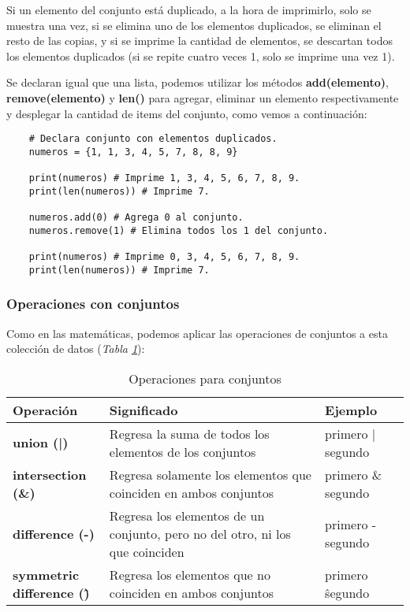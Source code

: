 Si un elemento del conjunto está duplicado, a la hora de imprimirlo, solo se muestra una vez, si se elimina uno de los elementos duplicados, se eliminan el resto de las copias, y si se imprime la cantidad de elementos, se descartan todos los elementos duplicados (si se repite cuatro veces 1, solo se imprime una vez 1).

Se declaran igual que una lista, podemos utilizar los métodos \textbf{add(elemento)},  \textbf{remove(elemento)} y \textbf{len()} para agregar, eliminar un elemento respectivamente y desplegar la cantidad de items del conjunto, como vemos a continuación:
\begin{lstlisting}
    # Declara conjunto con elementos duplicados.
    numeros = {1, 1, 3, 4, 5, 7, 8, 8, 9}

    print(numeros) # Imprime 1, 3, 4, 5, 6, 7, 8, 9.
    print(len(numeros)) # Imprime 7.

    numeros.add(0) # Agrega 0 al conjunto.
    numeros.remove(1) # Elimina todos los 1 del conjunto.

    print(numeros) # Imprime 0, 3, 4, 5, 6, 7, 8, 9.
    print(len(numeros)) # Imprime 7.
\end{lstlisting}


\subsubsection{Operaciones con conjuntos}

Como en las matemáticas, podemos aplicar las operaciones de conjuntos a esta colección de datos (\textit{Tabla \ref{tab: 9}}):
\begin{table}[H]
    \begin{center}
        \caption{Operaciones para conjuntos}
        \label{tab: 9}
        \begin{tabular}{m{4cm} m{5cm} m{4cm}}
            \hline
            \textbf{Operación}&\textbf{Significado}&\textbf{Ejemplo} \\
            \hline
            \textbf{union (|)}					& Regresa la suma de todos los elementos de los conjuntos							& primero | segundo \\
            \textbf{intersection (\&)}			& \parbox{5cm}{\raggedright Regresa solamente los elementos que coinciden en ambos conjuntos}					& primero \& segundo \\
            \textbf{difference (-)}			& Regresa los elementos de un conjunto, pero no del otro, ni los que coinciden	& primero - segundo \\
            \parbox{4cm}{\textbf{symmetric\\difference (\^)}}	& \parbox{5cm}{\raggedright Regresa los elementos que no coinciden en ambos conjuntos}						& primero \^ segundo \\
            \hline
        \end{tabular}
    \end{center}    
\end{table}

